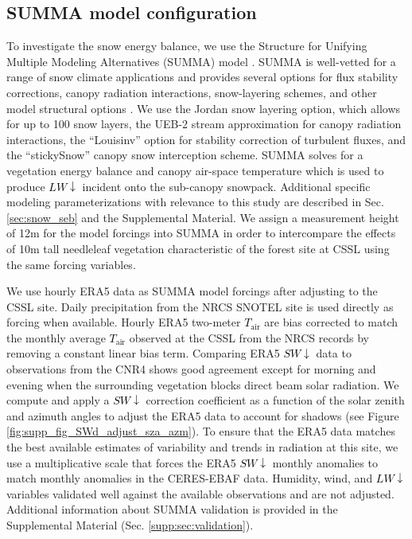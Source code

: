 \documentclass[draft]{agujournal2019}
\newcommand{\tair}{\textcolor{black}{$T_{\mathrm{air}}$}\xspace}
\newcommand{\lwdn}{\textcolor{black}{$LW\downarrow$}\xspace}
\newcommand{\swdn}{\textcolor{black}{$SW\downarrow$}\xspace}
\begin{document}
\subsection{SUMMA model configuration}\label{sec:models:summa}
To investigate the snow energy balance, we use the Structure for Unifying Multiple Modeling Alternatives (SUMMA) model \cite{Clark2015-ni}.
SUMMA is well-vetted for a range of snow climate applications and provides several options for flux stability corrections, canopy radiation interactions, snow-layering schemes, and other model structural options \cite{Cristea2022-ys}.
We use the Jordan snow layering option, which allows for up to 100 snow layers, the UEB-2 stream approximation for canopy radiation interactions, the ``Louisinv'' option for stability correction of turbulent fluxes, and the ``stickySnow'' canopy snow interception scheme.
SUMMA solves for a vegetation energy balance and canopy air-space temperature which is used to produce \lwdn incident onto the sub-canopy snowpack.
Additional specific modeling parameterizations with relevance to this study are described in Sec. \ref{sec:snow_seb} and the Supplemental Material.
We assign a measurement height of 12m for the model forcings into SUMMA in order to intercompare the effects of 10m tall needleleaf vegetation characteristic of the forest site at CSSL using the same forcing variables.

We use hourly ERA5 data \cite{Hersbach2020-era5} as SUMMA model forcings after adjusting to the CSSL site.
Daily precipitation from the NRCS SNOTEL site is used directly as forcing when available.
Hourly ERA5 two-meter \tair are bias corrected to match the monthly average \tair observed at the CSSL from the NRCS records by removing a constant linear bias term.
Comparing ERA5 \swdn data to observations from the CNR4 shows good agreement except for morning and evening when the surrounding vegetation  blocks direct beam solar radiation.
We compute and apply a \swdn correction coefficient as a function of the solar zenith and azimuth angles to adjust the ERA5 data to account for shadows (see Figure \ref{fig:supp_fig_SWd_adjust_sza_azm}).
To ensure that the ERA5 data matches the best available estimates of variability and trends in radiation at this site, we use a multiplicative scale that forces the ERA5 \swdn monthly anomalies to match monthly anomalies in the CERES-EBAF data.
Humidity, wind, and \lwdn variables validated well against the available observations and are not adjusted.
Additional information about SUMMA validation is provided in the Supplemental Material (Sec. \ref{supp:sec:validation}).
\end{document}
